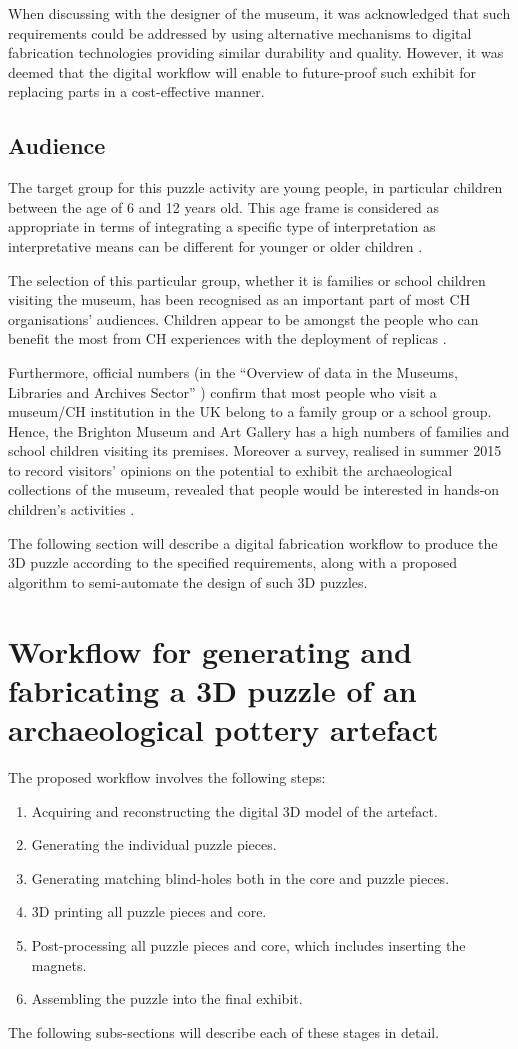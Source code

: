 \documentclass[acmlarge,screen]{acmart}
\begin{document}
When discussing with the designer of the museum, it was acknowledged that such requirements could be addressed by using alternative mechanisms to digital fabrication technologies providing similar durability and quality. However, it was deemed that the digital workflow will enable to future-proof such exhibit for replacing parts in a cost-effective manner.

\subsection{Audience}
The target group for this puzzle activity are young people, in particular children between the age of 6 and 12 years old. This age frame is considered as appropriate in terms of integrating a specific type of interpretation as interpretative means can be different for younger or older children \cite{Tilden1977}. 

The selection of this particular group, whether it is families or school children visiting the museum, has been recognised as an important part of most CH organisations' audiences. Children appear to be amongst the people who can benefit the most from CH experiences with the deployment of replicas \cite{Cabral2013,Neely2015,Miles2015}.

Furthermore, official numbers (in the ``Overview of data in the Museums, Libraries and Archives Sector'' \cite{Matty2004}) confirm that most people who visit a museum/CH institution in the UK belong to a family group or a school group. Hence, the Brighton Museum and Art Gallery has a high numbers of families and school children visiting its premises. Moreover a survey, realised in summer 2015 to record visitors' opinions on the potential to exhibit the archaeological collections of the museum, revealed that people would be interested in hands-on children's activities \cite{RoyalPavilionandMuseums2015}.

The following section will describe a digital fabrication workflow to produce the 3D puzzle according to the specified requirements, along with a proposed algorithm to semi-automate the design of such 3D puzzles.

\section{Workflow for generating and fabricating a 3D puzzle of an archaeological pottery artefact}
\label{workflow}
The proposed workflow involves the following steps:
\begin{enumerate}
\item Acquiring and reconstructing the digital 3D model of the artefact.
\item Generating the individual puzzle pieces.
\item Generating matching blind-holes both in the core and puzzle pieces.
\item 3D printing all puzzle pieces and core.
\item Post-processing all puzzle pieces and core, which includes inserting the magnets.
\item Assembling the puzzle into the final exhibit.
\end{enumerate}
The following subs-sections will describe each of these stages in detail.
\end{document}
